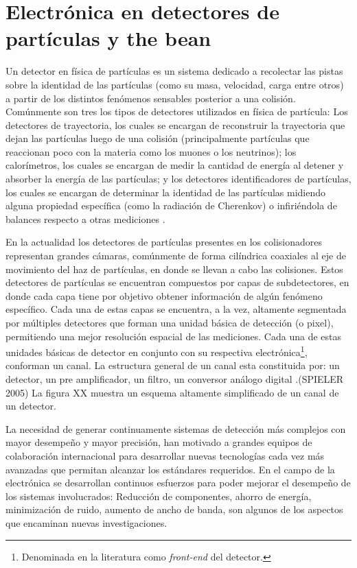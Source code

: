 \section{Electrónica en detectores de partículas y the bean}

 Un detector en física de partículas es un sistema dedicado a recolectar las pistas sobre la identidad de las partículas (como su masa, velocidad, carga entre otros) a partir de los distintos fenómenos sensables posterior a una colisión. Comúnmente son tres  los tipos de detectores utilizados en física de partícula: Los detectores de trayectoria, los cuales se encargan de reconstruir la trayectoria que dejan las partículas luego de una colisión (principalmente partículas que reaccionan poco con la materia como los muones o los neutrinos); los calorímetros, los cuales se encargan de medir la cantidad de energía al detener y absorber la energía de las partículas; y los detectores identificadores de partículas, los cuales se encargan de determinar la identidad de las partículas midiendo alguna propiedad específica (como la radiación de Cherenkov) o infiriéndola de balances respecto a otras mediciones \citep{cern101}.

En la actualidad los detectores de partículas presentes en los colisionadores representan  grandes cámaras, comúnmente de forma cilíndrica coaxiales al eje de movimiento del haz de partículas, en donde se llevan a cabo las colisiones. Estos detectores de partículas se encuentran compuestos por capas de subdetectores, en donde cada capa tiene por objetivo obtener información de algún fenómeno específico. Cada una de estas capas se encuentra, a la vez, altamente segmentada por múltiples detectores que forman una unidad básica de detección (o pixel), permitiendo una mejor resolución espacial de las mediciones. Cada una de estas unidades básicas de detector en conjunto con su respectiva electrónica\footnote{Denominada en la literatura como \textit{front-end} del detector.}, conforman un canal. La estructura general de un canal esta constituida por: un detector, un pre amplificador, un filtro, un conversor análogo digital .(SPIELER 2005) La figura XX muestra un esquema altamente simplificado de un canal de un detector.

La necesidad de generar continuamente sistemas de detección más complejos con mayor desempeño y mayor precisión, han motivado a grandes equipos de colaboración internacional para desarrollar nuevas tecnologías cada vez más avanzadas que permitan alcanzar los estándares requeridos. En el campo de la electrónica se desarrollan continuos esfuerzos para poder mejorar el desempeño de los sistemas involucrados: Reducción de componentes, ahorro de energía, minimización de ruido, aumento de ancho de banda, son algunos de los aspectos que encaminan nuevas investigaciones.


